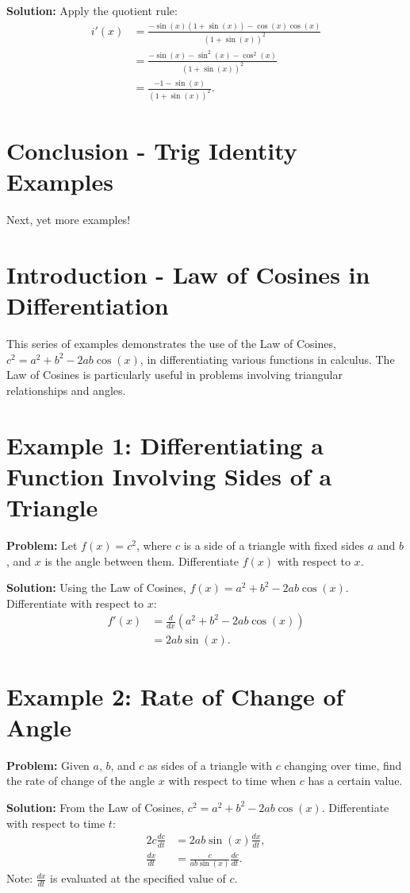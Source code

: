 \documentclass[a4paper,12pt]{book}
\newcounter{problem}
\newcounter{example}
\begin{document}
\textbf{Solution:}
Apply the quotient rule:
\begin{align*}
i'(x) &= \frac{-\sin(x)(1 + \sin(x)) - \cos(x)\cos(x)}{(1 + \sin(x))^2} \\
&= \frac{-\sin(x) - \sin^2(x) - \cos^2(x)}{(1 + \sin(x))^2} \\
&= \frac{-1 - \sin(x)}{(1 + \sin(x))^2}.
\end{align*}

\section*{Conclusion - Trig Identity Examples}
Next, yet more examples!

\section{Introduction - Law of Cosines in Differentiation}
This series of examples demonstrates the use of the Law of Cosines, $c^2 = a^2 + b^2 - 2ab \cos(x)$, in differentiating various functions in calculus. The Law of Cosines is particularly useful in problems involving triangular relationships and angles.

\section*{Example 1: Differentiating a Function Involving Sides of a Triangle}
\textbf{Problem:} Let $f(x) = c^2$, where $c$ is a side of a triangle with fixed sides $a$ and $b$, and $x$ is the angle between them. Differentiate $f(x)$ with respect to $x$.

\textbf{Solution:}
Using the Law of Cosines, $f(x) = a^2 + b^2 - 2ab \cos(x)$. Differentiate with respect to $x$:
\begin{align*}
f'(x) &= \frac{d}{dx}(a^2 + b^2 - 2ab \cos(x)) \\
&= 2ab \sin(x).
\end{align*}

\section*{Example 2: Rate of Change of Angle}
\textbf{Problem:} Given $a$, $b$, and $c$ as sides of a triangle with $c$ changing over time, find the rate of change of the angle $x$ with respect to time when $c$ has a certain value.

\textbf{Solution:}
From the Law of Cosines, $c^2 = a^2 + b^2 - 2ab \cos(x)$. Differentiate with respect to time $t$:
\begin{align*}
2c \frac{dc}{dt} &= 2ab \sin(x) \frac{dx}{dt}, \\
\frac{dx}{dt} &= \frac{c}{ab \sin(x)} \frac{dc}{dt}.
\end{align*}
Note: $\frac{dx}{dt}$ is evaluated at the specified value of $c$.
\end{document}
